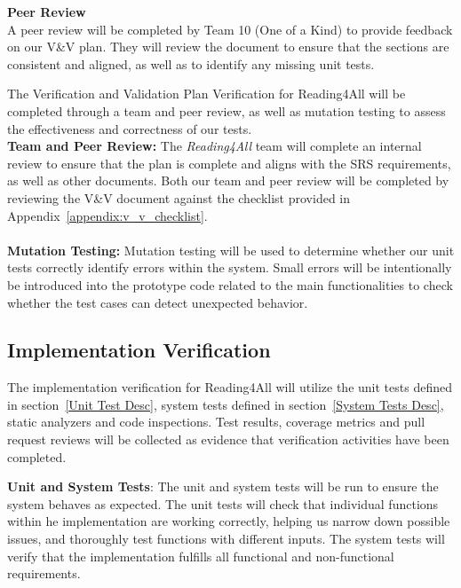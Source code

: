 \documentclass[12pt, titlepage]{article}
\begin{document}
\textbf{Peer Review}\\
A peer review will be completed by Team 10 (One of a Kind) to provide
feedback on our V\&V plan. They will review the document to ensure
that the sections are consistent and aligned, as well as to identify
any missing unit tests.

The Verification and Validation Plan Verification for Reading4All
will be completed through a team and peer review, as well as mutation
testing to assess the effectiveness and correctness of our tests. \\

\textbf{Team and Peer Review:}
The \textit{Reading4All} team will complete an internal review to
ensure that the plan is complete and aligns with the SRS
requirements, as well as other documents.
Both our team and peer review will be completed by reviewing the V\&V
document against the checklist provided in
Appendix~\ref{appendix:v_v_checklist}.   \\ \\

\textbf{Mutation Testing:}
Mutation testing will be used to determine whether our unit tests
correctly identify errors within the system.
Small errors will be intentionally be introduced into the prototype
code related to the main functionalities to check whether the test
cases can detect unexpected behavior.

\subsection{Implementation Verification}

The implementation verification for Reading4All will utilize the unit tests defined in section~\ref{Unit Test Desc}, system tests defined in section~\ref{System Tests Desc},
static analyzers and code inspections. Test results, coverage metrics and pull request reviews will be collected as evidence that verification activities have been completed. 

\textbf{Unit and System Tests}:
The unit and system tests will be run to ensure the system behaves as expected. The unit tests will check that individual functions within he implementation are working correctly, helping us narrow down possible issues, and thoroughly test functions with different inputs. 
The system tests will verify that the implementation fulfills all functional and non-functional requirements. \\
\end{document}
